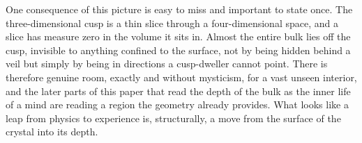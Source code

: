 One consequence of this picture is easy to miss and important to state once. The three-dimensional cusp is a thin slice through a four-dimensional space, and a slice has measure zero in the volume it sits in. Almost the entire bulk lies off the cusp, invisible to anything confined to the surface, not by being hidden behind a veil but simply by being in directions a cusp-dweller cannot point. There is therefore genuine room, exactly and without mysticism, for a vast unseen interior, and the later parts of this paper that read the depth of the bulk as the inner life of a mind are reading a region the geometry already provides. What looks like a leap from physics to experience is, structurally, a move from the surface of the crystal into its depth.
